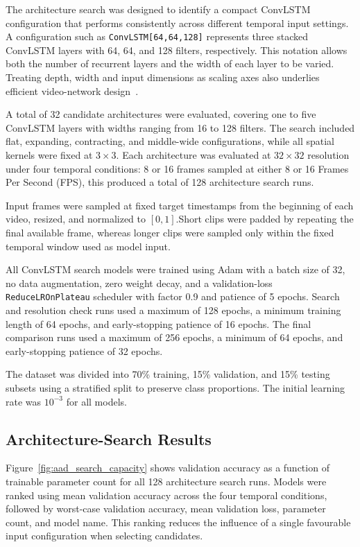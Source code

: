 \documentclass[journal,article,submit,moreauthors]{Definitions/mdpi}
\begin{document}
    The architecture search was designed to identify a compact ConvLSTM configuration that performs
    consistently across different temporal input settings. A configuration such as
    \texttt{ConvLSTM[64,64,128]} represents three stacked ConvLSTM layers with 64, 64, and 128 
    filters, respectively. This notation allows both the number of recurrent layers and the width
    of each layer to be varied. Treating depth, width and input dimensions as scaling axes also
    underlies efficient video-network design~\cite{feichtenhofer2020x3d}.

    A total of 32 candidate architectures were evaluated, covering one to five ConvLSTM layers
    with widths ranging from 16 to 128 filters. The search included flat, expanding, contracting,
    and middle-wide configurations, while all spatial kernels were fixed at $3\times3$. Each
    architecture was evaluated at $32\times32$ resolution under four temporal conditions: 8 or 16
    frames sampled at either 8 or 16 Frames Per Second (FPS), this produced a total
    of 128 architecture search runs.

    Input frames were sampled at fixed target timestamps from the beginning of each video, resized,
    and normalized to $[0,1]$.Short clips were padded by repeating the final available frame, 
    whereas longer clips were sampled only within the fixed temporal window used as model input.

    All ConvLSTM search models were trained using Adam with a batch size of 32, no data 
    augmentation, zero weight decay, and a validation-loss \texttt{ReduceLROnPlateau} scheduler
    with factor 0.9 and patience of 5 epochs. Search and resolution check runs used a maximum of
    128 epochs, a minimum training length of 64 epochs, and early-stopping patience of 16 epochs.
    The final comparison runs used a maximum of 256 epochs, a minimum of 64 epochs, and 
    early-stopping patience of 32 epochs.

    The dataset was divided into 70\% training, 15\% validation, and 15\% testing subsets using
    a stratified split to preserve class proportions. The initial learning rate was $10^{-3}$
    for all models.
    
    \subsection{Architecture-Search Results}
    \label{sec:search-results}

    Figure~\ref{fig:aad_search_capacity} shows validation accuracy as a function of trainable
    parameter count for all 128 architecture search runs. Models were ranked using mean
    validation accuracy across the four temporal conditions, followed by worst-case validation
    accuracy, mean validation loss, parameter count, and model name. This ranking reduces the
    influence of a single favourable input configuration when selecting candidates.
\end{document}
